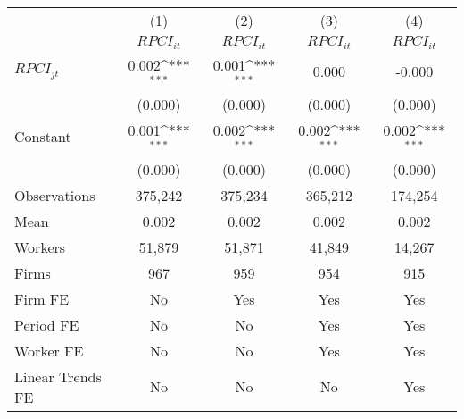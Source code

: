 {
\def\sym#1{\ifmmode^{#1}\else\(^{#1}\)\fi}
\begin{tabular}{l*{4}{c}}
\hline\hline
                    &\multicolumn{1}{c}{(1)}&\multicolumn{1}{c}{(2)}&\multicolumn{1}{c}{(3)}&\multicolumn{1}{c}{(4)}\\
                    &\multicolumn{1}{c}{$RPCI_{it}$}&\multicolumn{1}{c}{$RPCI_{it}$}&\multicolumn{1}{c}{$RPCI_{it}$}&\multicolumn{1}{c}{$RPCI_{it}$}\\
\hline
$RPCI_{jt}$         &       0.002\sym{***}&       0.001\sym{***}&       0.000         &      -0.000         \\
                    &     (0.000)         &     (0.000)         &     (0.000)         &     (0.000)         \\
[1em]
Constant            &       0.001\sym{***}&       0.002\sym{***}&       0.002\sym{***}&       0.002\sym{***}\\
                    &     (0.000)         &     (0.000)         &     (0.000)         &     (0.000)         \\
\hline
Observations        &     375,242         &     375,234         &     365,212         &     174,254         \\
Mean                &       0.002         &       0.002         &       0.002         &       0.002         \\
Workers             &      51,879         &      51,871         &      41,849         &      14,267         \\
Firms               &         967         &         959         &         954         &         915         \\
Firm FE             &          No         &         Yes         &         Yes         &         Yes         \\
Period FE           &          No         &          No         &         Yes         &         Yes         \\
Worker FE           &          No         &          No         &         Yes         &         Yes         \\
Linear Trends FE    &          No         &          No         &          No         &         Yes         \\
\hline\hline
\end{tabular}
}
